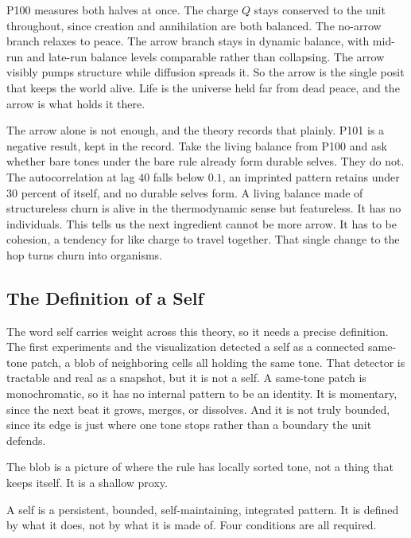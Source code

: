 P100 measures both halves at once. The charge $Q$ stays conserved to the unit throughout, since creation and annihilation are both balanced. The no-arrow branch relaxes to peace. The arrow branch stays in dynamic balance, with mid-run and late-run balance levels comparable rather than collapsing. The arrow visibly pumps structure while diffusion spreads it. So the arrow is the single posit that keeps the world alive. Life is the universe held far from dead peace, and the arrow is what holds it there.

The arrow alone is not enough, and the theory records that plainly. P101 is a negative result, kept in the record. Take the living balance from P100 and ask whether bare tones under the bare rule already form durable selves. They do not. The autocorrelation at lag $40$ falls below $0.1$, an imprinted pattern retains under $30$ percent of itself, and no durable selves form. A living balance made of structureless churn is alive in the thermodynamic sense but featureless. It has no individuals. This tells us the next ingredient cannot be more arrow. It has to be cohesion, a tendency for like charge to travel together. That single change to the hop turns churn into organisms.

\subsection{The Definition of a Self}

The word self carries weight across this theory, so it needs a precise definition. The first experiments and the visualization detected a self as a connected same-tone patch, a blob of neighboring cells all holding the same tone. That detector is tractable and real as a snapshot, but it is not a self. A same-tone patch is monochromatic, so it has no internal pattern to be an identity. It is momentary, since the next beat it grows, merges, or dissolves. And it is not truly bounded, since its edge is just where one tone stops rather than a boundary the unit defends.

The blob is a picture of where the rule has locally sorted tone, not a thing that keeps itself. It is a shallow proxy.

A self is a persistent, bounded, self-maintaining, integrated pattern. It is defined by what it does, not by what it is made of. Four conditions are all required.

